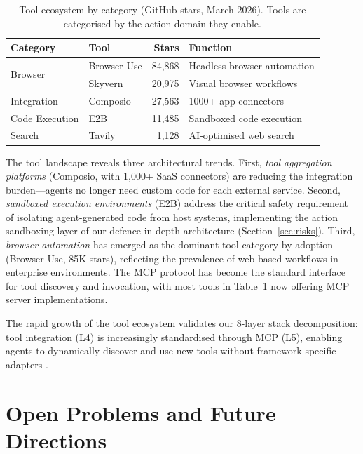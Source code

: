 \documentclass[review]{elsarticle}
\theoremstyle{definition}
\begin{document}
\begin{table}[ht]
\centering
\caption{Tool ecosystem by category (GitHub stars, March 2026). Tools are categorised by the action domain they enable.}
\label{tab:tools}
\begin{tabular}{llrl}
\toprule
\textbf{Category} & \textbf{Tool} & \textbf{Stars} & \textbf{Function} \\
\midrule
\multirow{2}{*}{Browser}     & Browser Use & 84,868 & Headless browser automation \\
                              & Skyvern     & 20,975 & Visual browser workflows \\
Integration                   & Composio    & 27,563 & 1000+ app connectors \\
Code Execution                & E2B         & 11,485 & Sandboxed code execution \\
Search                        & Tavily      & 1,128  & AI-optimised web search \\
\bottomrule
\end{tabular}
\end{table}

The tool landscape reveals three architectural trends. First, \emph{tool aggregation platforms} (Composio, with 1,000+ SaaS connectors) are reducing the integration burden---agents no longer need custom code for each external service. Second, \emph{sandboxed execution environments} (E2B) address the critical safety requirement of isolating agent-generated code from host systems, implementing the action sandboxing layer of our defence-in-depth architecture (Section~\ref{sec:risks}). Third, \emph{browser automation} has emerged as the dominant tool category by adoption (Browser Use, 85K stars), reflecting the prevalence of web-based workflows in enterprise environments. The MCP protocol \citep{anthropic2024mcp} has become the standard interface for tool discovery and invocation, with most tools in Table~\ref{tab:tools} now offering MCP server implementations.

The rapid growth of the tool ecosystem validates our 8-layer stack decomposition: tool integration (L4) is increasingly standardised through MCP (L5), enabling agents to dynamically discover and use new tools without framework-specific adapters \citep{qin2024toollearning}.

\section{Open Problems and Future Directions}\label{sec:future}
\end{document}
